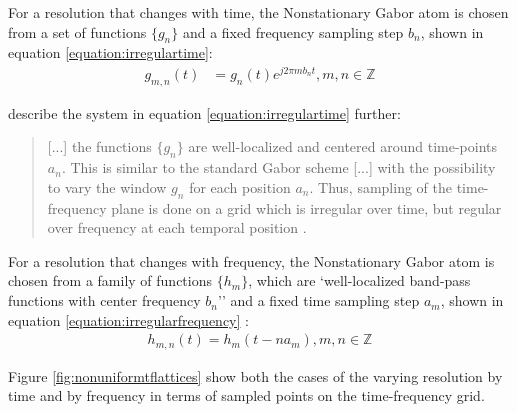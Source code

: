 \documentclass[report.tex]{subfiles}
\begin{document}
For a resolution that changes with time, the Nonstationary Gabor atom is chosen from a set of functions $\{g_{n}\}$ and a fixed frequency sampling step $b_{n}$, shown in equation \eqref{equation:irregulartime}:
\begin{align}\tag{14}\label{equation:irregulartime}
	g_{m,n}(t) &= g_{n}(t)e^{j2\pi m b_{n}t}, m,n \in \mathbb{Z}
\end{align}

\citeauthor{balazs} describe the system in equation \eqref{equation:irregulartime} further:

\begin{quote}
	[...] the functions $\{g_{n}\}$ are well-localized and centered around time-points $a_{n}$. This is similar to the standard Gabor scheme [...] with the possibility to vary the window $g_{n}$ for each position $a_{n}$. Thus, sampling of the time-frequency plane is done on a grid which is irregular over time, but regular over frequency at each temporal position \parencite[1485]{balazs}.
\end{quote}

For a resolution that changes with frequency, the Nonstationary Gabor atom is chosen from a family of functions $\{h_{m}\}$, which are `well-localized band-pass functions with center frequency $b_{n}$'' and a fixed time sampling step $a_{m}$, shown in equation \eqref{equation:irregularfrequency} \parencite[1486]{balazs}:
\begin{align}\tag{15}\label{equation:irregularfrequency}
	h_{m,n}(t) = h_{m}(t - na_{m}), m,n \in \mathbb{Z}
\end{align}

Figure \ref{fig:nonuniformtflattices} show both the cases of the varying resolution by time and by frequency in terms of sampled points on the time-frequency grid.
\end{document}
